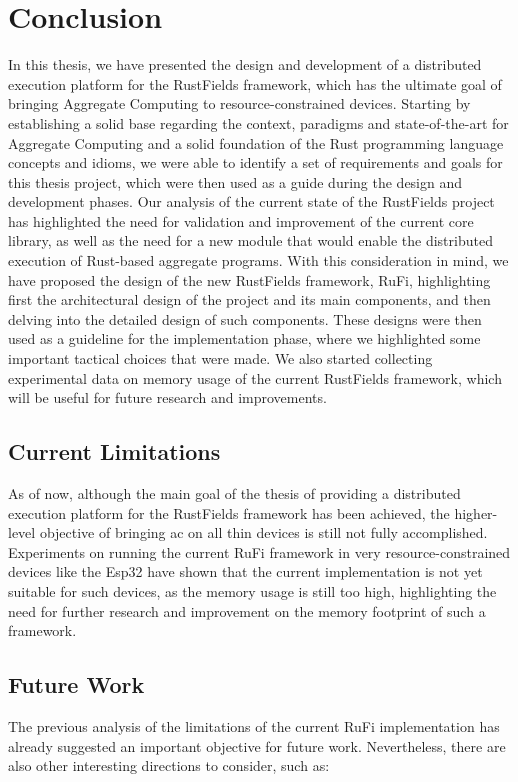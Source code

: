 \chapter{Conclusion}
\label{chap:conclusions}
In this thesis, we have presented the design and development of a distributed execution platform for the RustFields framework, which has the ultimate goal of bringing Aggregate Computing to resource-constrained devices.
Starting by establishing a solid base regarding the context, paradigms and state-of-the-art for Aggregate Computing and a solid foundation of the Rust programming language concepts and idioms,
we were able to identify a set of requirements and goals for this thesis project, which were then used as a guide during the design and development phases.
Our analysis of the current state of the RustFields project has highlighted the need for validation and improvement of the current core library, as well as the need for a new module that would enable
the distributed execution of Rust-based aggregate programs. With this consideration in mind, we have proposed the design of the new RustFields framework, RuFi, highlighting first the architectural design of the project and its main
components, and then delving into the detailed design of such components. These designs were then used as a guideline for the implementation phase, where we highlighted some important tactical choices that were made.
We also started collecting experimental data on memory usage of the current RustFields framework, which will be useful for future research and improvements.

\section{Current Limitations}
As of now, although the main goal of the thesis of providing a distributed execution platform for the RustFields framework has been achieved, the higher-level objective of bringing \ac{ac} on all thin devices is still not fully accomplished.
Experiments on running the current RuFi framework in very resource-constrained devices like the Esp32 have shown that the current implementation is not yet suitable for such devices, as the memory usage is still too high, highlighting the need
for further research and improvement on the memory footprint of such a framework.

\section{Future Work}
The previous analysis of the limitations of the current RuFi implementation has already suggested an important objective for future work.
Nevertheless, there are also other interesting directions to consider, such as:

